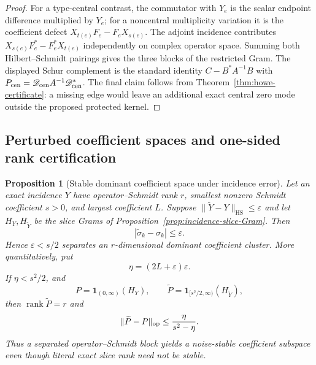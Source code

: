 \documentclass[11pt]{article}
\numberwithin{equation}{section}
\newtheorem{proposition}[theorem]{Proposition}
\theoremstyle{definition}
\theoremstyle{remark}
\newcommand{\rank}{\operatorname{rank}}
\newcommand{\HS}{\mathrm{HS}}
\newcommand{\norm}[1]{\lVert#1\rVert}
\begin{document}
\begin{proof}
For a type-central contrast, the commutator with $Y_e$ is the scalar endpoint
difference multiplied by $Y_e$; for a noncentral multiplicity variation it is
the coefficient defect $X_{t(e)}F_e-F_eX_{s(e)}$.  The adjoint incidence
contributes $X_{s(e)}F_e^*-F_e^*X_{t(e)}$ independently on complex operator
space.  Summing both Hilbert--Schmidt pairings gives the three blocks of the
restricted Gram.  The displayed Schur complement is the standard identity
$C-B^*A^{-1}B$ with
$P_{\rm cen}=\mathscr D_{\rm cen}A^{-1}\mathscr D_{\rm cen}^*$.  The final
claim follows from Theorem~\ref{thm:howe-certificate}: a missing edge would
leave an additional exact central zero mode outside the proposed protected
kernel.
\end{proof}


\subsection{Perturbed coefficient spaces and one-sided rank certification}
\label{app:coefficient-stability}

\begin{proposition}[Stable dominant coefficient space under incidence error]
\label{thm:incidence-slice-cluster}
Let an exact incidence $Y$ have operator--Schmidt rank $r$, smallest nonzero
Schmidt coefficient $s>0$, and largest coefficient $L$.  Suppose
$\|\widetilde Y-Y\|_{\HS}\le\varepsilon$ and let
$H_Y,H_{\widetilde Y}$ be the slice Grams of
Proposition~\ref{prop:incidence-slice-Gram}.  Then
\begin{equation}
 |\widetilde\sigma_k-\sigma_k|\le\varepsilon.
 \label{eq:incidence-Schmidt-Weyl}
\end{equation}
Hence $\varepsilon<s/2$ separates an $r$-dimensional dominant coefficient
cluster.  More quantitatively, put
\[
 \eta=(2L+\varepsilon)\varepsilon.
\]
If $\eta<s^2/2$, and
\[
 P=\mathbf1_{(0,\infty)}(H_Y),\qquad
 \widetilde P=\mathbf1_{[s^2/2,\infty)}(H_{\widetilde Y}),
\]
then $\rank\widetilde P=r$ and
\begin{equation}
 \norm{\widetilde P-P}_{\rm op}
 \le\frac{\eta}{s^2-\eta}.
 \label{eq:incidence-slice-projector}
\end{equation}
Thus a separated operator--Schmidt block yields a noise-stable coefficient
subspace even though literal exact slice rank need not be stable.
\end{proposition}
\end{document}
